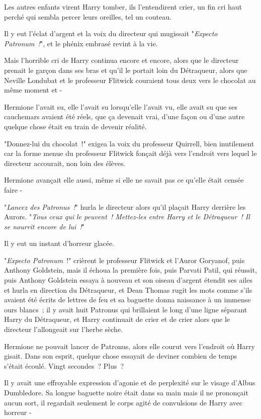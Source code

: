 \later

Les autres enfants virent Harry tomber, ils l'entendirent crier, un fin cri haut perché qui sembla percer leurs oreilles, tel un couteau.

Il y eut l'éclat d'argent et la voix du directeur qui mugissait "\emph{Expecto Patronum~!}", et le phénix embrasé revint à la vie.

Mais l'horrible cri de Harry continua encore et encore, alors que le directeur prenait le garçon dans ses bras et qu'il le portait loin du Détraqueur, alors que Neville Londubat et le professeur Flitwick couraient tous deux vers le chocolat au même moment et -

Hermione l'avait su, elle l'avait su lorsqu'elle l'avait vu, elle avait su que ses cauchemars avaient été réels, que ça devenait vrai, d'une façon ou d'une autre quelque chose était en train de devenir réalité.

"Donnez-lui du chocolat~!" exigea la voix du professeur Quirrell, bien inutilement car la forme menue du professeur Flitwick fonçait déjà vers l'endroit vers lequel le directeur accourait, non loin des élèves.

Hermione avançait elle aussi, même si elle ne savait pas ce qu'elle était censée faire -

"\emph{Lancez des Patronus~!}" hurla le directeur alors qu'il plaçait Harry derrière les Aurors. "\emph{Tous ceux qui le peuvent~! Mettez-les entre Harry et le Détraqueur~! Il se nourrit encore de lui~!}"

Il y eut un instant d'horreur glacée.

"\emph{Expecto Patronum}~!" crièrent le professeur Flitwick et l'Auror Goryanof, puis Anthony Goldstein, mais il échoua la première fois, puis Parvati Patil, qui réussit, puis Anthony Goldstein essaya à nouveau et son oiseau d'argent étendit ses ailes et hurla en direction du Détraqueur, et Dean Thomas rugit les mots comme s'ils avaient été écrits de lettres de feu et sa baguette donna naissance à un immense ours blancs~; il y avait huit Patronus qui brillaient le long d'une ligne séparant Harry du Détraqueur, et Harry continuait de crier et de crier alors que le directeur l'allongeait sur l'herbe sèche.

Hermione ne pouvait lancer de Patronus, alors elle courut vers l'endroit où Harry gisait. Dans son esprit, quelque chose essayait de deviner combien de temps s'était écoulé. Vingt secondes~? Plus~?

Il y avait une effroyable expression d'agonie et de perplexité sur le visage d'Albus Dumbledore. Sa longue baguette noire était dans sa main mais il ne prononçait aucun sort, il regardait seulement le corps agité de convulsions de Harry avec horreur -

